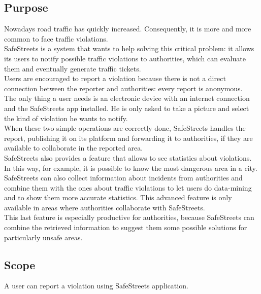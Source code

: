 \documentclass{article}
\begin{document}
		\subsection{Purpose}
		Nowadays road traffic has quickly increased. Consequently, it is more and more common to face traffic violations.\\
		SafeStreets is a system that wants to help solving this critical problem: it allows its users to notify possible traffic violations to authorities, which can evaluate them and eventually generate traffic tickets.\\
		Users are encouraged to report a violation because there is not a direct connection between the reporter and authorities: every report is anonymous.\\
		The only thing a user needs is an electronic device with an internet connection and the SafeStreets app installed. He is only asked to take a picture and select the kind of violation he wants to notify.\\
		When these two simple operations are correctly done, SafeStreets handles the report, publishing it on its platform and forwarding it to authorities, if they are available to collaborate in the reported area.\\
		SafeStreets also provides a feature that allows to see statistics about violations. In this way, for example, it is possible to know the most dangerous area in a city.\\
		SafeStreets can also collect information about incidents from authorities and combine them with the ones about traffic violations to let users do data-mining and to show them more accurate statistics. This advanced feature is only available in areas where authorities collaborate with SafeStreets.\\
		This last feature is especially productive for authorities, because SafeStreets can combine the retrieved information to suggest them some possible solutions for particularly unsafe areas.\\
	
		\subsection{Scope}
			A user can report a violation using SafeStreets application.
\end{document}
